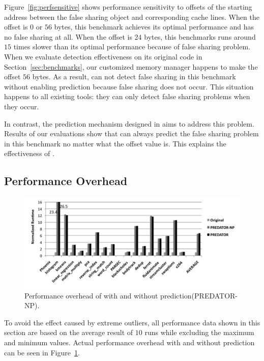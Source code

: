 Figure~\ref{fig:perfsensitive} shows performance sensitivity to 
offsets of the starting address between the false sharing object and corresponding cache lines. 
When the offset is $0$ or $56$ bytes, this benchmark achieves its optimal performance 
and has no false sharing at all.
When the offset is $24$ bytes, this benchmarks runs around $15$ times slower 
than its optimal performance because of false sharing problem.
When we evaluate detection effectiveness on its original code in Section~\ref{sec:benchmarks}, 
our customized memory manager happens to make the offset $56$ bytes. 
As a result, \Predator{} can not detect false sharing in this benchmark 
without enabling prediction because false sharing does not occur.
This situation happens to all existing tools: they can only detect false sharing problems when
they occur. 

In contrast, the prediction mechanism designed in \predator{} 
aims to address this problem. Results of our evaluations show 
that \Predator{} can always predict the false sharing problem in this
benchmark no matter what the offset value is. 
This explains the effectiveness of \Predator{}.

\subsection{Performance Overhead}
\label{sec:perfoverhead}

\begin{figure}[!ht]
\begin{center}
\includegraphics[width=6.5in]{fig/perf}
\end{center}
\caption{
Performance overhead of \Predator{} with and without prediction(PREDATOR-NP).
\label{fig:perf}}
\end{figure}

To avoid the effect caused by extreme outliers, all performance data shown in this section
are based on the average result of $10$ runs while excluding the maximum and minimum values.
Actual performance overhead with and without prediction 
can be seen in Figure~\ref{fig:perf}. 

